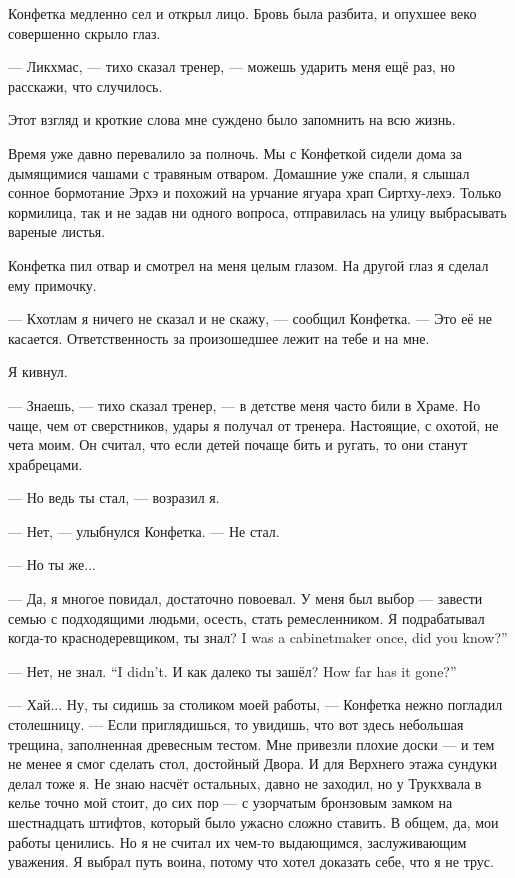 Конфетка медленно сел и открыл лицо.
Бровь была разбита, и опухшее веко совершенно скрыло глаз.

--- Ликхмас, --- тихо сказал тренер, --- можешь ударить меня ещё раз, но расскажи, что случилось.

Этот взгляд и кроткие слова мне суждено было запомнить на всю жизнь.

\asterism

Время уже давно перевалило за полночь.
Мы с Конфеткой сидели дома за дымящимися чашами с травяным отваром.
Домашние уже спали, я слышал сонное бормотание Эрхэ и похожий на урчание ягуара храп Сиртху-лехэ.
Только кормилица, так и не задав ни одного вопроса, отправилась на улицу выбрасывать вареные листья.

Конфетка пил отвар и смотрел на меня целым глазом.
На другой глаз я сделал ему примочку.

--- Кхотлам я ничего не сказал и не скажу, --- сообщил Конфетка.
--- Это её не касается.
Ответственность за произошедшее лежит на тебе и на мне.

Я кивнул.

--- Знаешь, --- тихо сказал тренер, --- в детстве меня часто били в Храме.
Но чаще, чем от сверстников, удары я получал от тренера.
Настоящие, с охотой, не чета моим.
Он считал, что если детей почаще бить и ругать, то они станут храбрецами.

--- Но ведь ты стал, --- возразил я.

--- Нет, --- улыбнулся Конфетка.
--- Не стал.

--- Но ты же...

--- Да, я многое повидал, достаточно повоевал.
У меня был выбор --- завести семью с подходящими людьми, осесть, стать ремесленником.
{Я подрабатывал когда-то краснодеревщиком, ты знал?}
{I was a cabinetmaker once, did you know?''}

{--- Нет, не знал.}
{``I didn't.}
{И как далеко ты зашёл?}
{How far has it gone?''}

--- Хай...
Ну, ты сидишь за столиком моей работы, --- Конфетка нежно погладил столешницу.
--- Если приглядишься, то увидишь, что вот здесь небольшая трещина, заполненная древесным тестом.
Мне привезли плохие доски --- и тем не менее я смог сделать стол, достойный Двора.
И для Верхнего этажа сундуки делал тоже я.
Не знаю насчёт остальных, давно не заходил, но у Трукхвала в келье точно мой стоит, до сих пор --- с узорчатым бронзовым замком на шестнадцать штифтов, который было ужасно сложно ставить.
В общем, да, мои работы ценились.
Но я не считал их чем-то выдающимся, заслуживающим уважения.
Я выбрал путь воина, потому что хотел доказать себе, что я не трус.

